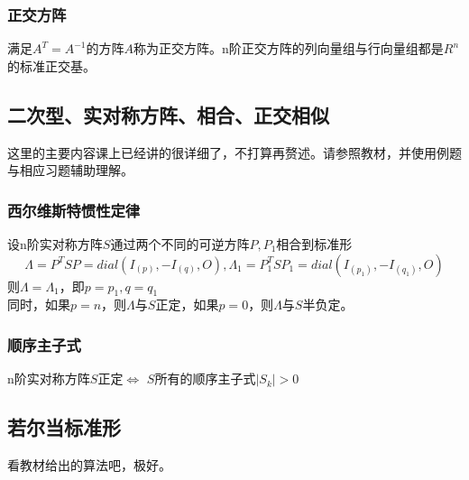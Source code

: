 \documentclass[UTF8]{ctexart}
\begin{document}
\subsubsection{正交方阵}
满足$A^{T}=A^{-1}$的方阵$A$称为正交方阵。n阶正交方阵的列向量组与行向量组都是$R^{n}$的标准正交基。
\subsection{二次型、实对称方阵、相合、正交相似}
这里的主要内容课上已经讲的很详细了，不打算再赘述。请参照教材，并使用例题与相应习题辅助理解。
\subsubsection{西尔维斯特惯性定律}
设n阶实对称方阵$S$通过两个不同的可逆方阵$P,P_{1}$相合到标准形
\[\Lambda=P^{T}SP=dial(I_{(p)},-I_{(q)},\mathit{O}),\Lambda_{1}=P_{1}^{T}SP_{1}=dial(I_{(p_1)},-I_{(q_1)},\mathit{O}) \]
则$\Lambda=\Lambda_{1}$，即$p=p_1,q=q_1$\\
\indent
同时，如果$p=n$，则$\Lambda$与$S$正定，如果$p=0$，则$\Lambda$与$S$半负定。
\subsubsection{顺序主子式}
n阶实对称方阵$S$正定$\Leftrightarrow$ $S$所有的顺序主子式$|S_k|>0$
\subsection{若尔当标准形}
看教材给出的算法吧，极好。
\end{document}
